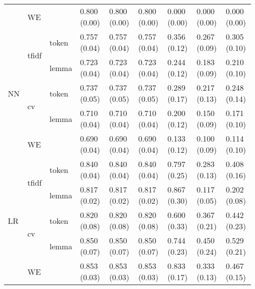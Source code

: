 \begin{tabular}{lllllllll}
 & WE &  & 0.800 (0.00) & 0.800 (0.00) & 0.800 (0.00) & 0.000 (0.00) & 0.000 (0.00) & 0.000 (0.00) \\
\multirow[c]{5}{*}{NN} & \multirow[c]{2}{*}{tfidf} & token & 0.757 (0.04) & 0.757 (0.04) & 0.757 (0.04) & 0.356 (0.12) & 0.267 (0.09) & 0.305 (0.10) \\
 &  & lemma & 0.723 (0.04) & 0.723 (0.04) & 0.723 (0.04) & 0.244 (0.12) & 0.183 (0.09) & 0.210 (0.10) \\
 & \multirow[c]{2}{*}{cv} & token & 0.737 (0.05) & 0.737 (0.05) & 0.737 (0.05) & 0.289 (0.17) & 0.217 (0.13) & 0.248 (0.14) \\
 &  & lemma & 0.710 (0.04) & 0.710 (0.04) & 0.710 (0.04) & 0.200 (0.12) & 0.150 (0.09) & 0.171 (0.10) \\
 & WE &  & 0.690 (0.04) & 0.690 (0.04) & 0.690 (0.04) & 0.133 (0.12) & 0.100 (0.09) & 0.114 (0.10) \\
\multirow[c]{5}{*}{LR} & \multirow[c]{2}{*}{tfidf} & token & 0.840 (0.04) & 0.840 (0.04) & 0.840 (0.04) & 0.797 (0.25) & 0.283 (0.13) & 0.408 (0.16) \\
 &  & lemma & 0.817 (0.02) & 0.817 (0.02) & 0.817 (0.02) & 0.867 (0.30) & 0.117 (0.05) & 0.202 (0.08) \\
 & \multirow[c]{2}{*}{cv} & token & 0.820 (0.08) & 0.820 (0.08) & 0.820 (0.08) & 0.600 (0.33) & 0.367 (0.21) & 0.442 (0.23) \\
 &  & lemma & 0.850 (0.07) & 0.850 (0.07) & 0.850 (0.07) & 0.744 (0.23) & 0.450 (0.24) & 0.529 (0.21) \\
 & WE &  & 0.853 (0.03) & 0.853 (0.03) & 0.853 (0.03) & 0.833 (0.17) & 0.333 (0.13) & 0.467 (0.15) \\
\end{tabular}
